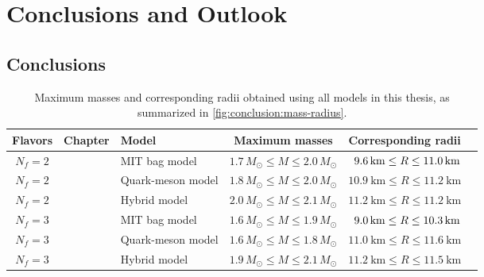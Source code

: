 \chapter{Conclusions and Outlook}

\section{Conclusions}

\begin{table}[b!]
\centering
\caption{\label{tab:master_conclusion:results}%
Maximum masses and corresponding radii obtained using all models in this thesis,
as summarized in \cref{fig:conclusion:mass-radius}.
}
{\setlength{\tabcolsep}{4pt} %
\begin{tabular}{ c l l c c c }
	\toprule
	Flavors & Chapter & Model & Maximum masses & Corresponding radii                            \\
	\midrule
	$N_f=2$ & \Cref{chap:mit} & MIT bag model & $1.7 \, M_\odot \leq M \leq 2.0 \, M_\odot$ & $\hphantom{1}\SI{9.6}{\kilo\meter} \leq R \leq \SI{11.0}{\kilo\meter}$ \\
	$N_f=2$ & \Cref{chap:lsm2f} & Quark-meson model & $1.8 \, M_\odot \leq M \leq 2.0 \, M_\odot$ & $\SI{10.9}{\kilo\meter} \leq R \leq \SI{11.2}{\kilo\meter}$ \\
	$N_f=2$ & \Cref{chap:hybrid} & Hybrid model & $2.0 \, M_\odot \leq M \leq 2.1 \, M_\odot$ & $\SI{11.2}{\kilo\meter} \leq R \leq \SI{11.2}{\kilo\meter}$ \\
	\midrule
	$N_f=3$ & \Cref{chap:mit} & MIT bag model & $1.6 \, M_\odot \leq M \leq 1.9 \, M_\odot$ & $\hphantom{1}\SI{9.0}{\kilo\meter} \leq R \leq \SI{10.3}{\kilo\meter}$ \\
	$N_f=3$ & \Cref{chap:lsm3f} & Quark-meson model & $1.6 \, M_\odot \leq M \leq 1.8 \, M_\odot$ & $\SI{11.0}{\kilo\meter} \leq R \leq \SI{11.6}{\kilo\meter}$ \\
	$N_f=3$ & \Cref{chap:hybrid} & Hybrid model & $1.9 \, M_\odot \leq M \leq 2.1 \, M_\odot$ & $\SI{11.2}{\kilo\meter} \leq R \leq \SI{11.5}{\kilo\meter}$ \\
	\bottomrule
\end{tabular}}
\end{table}
